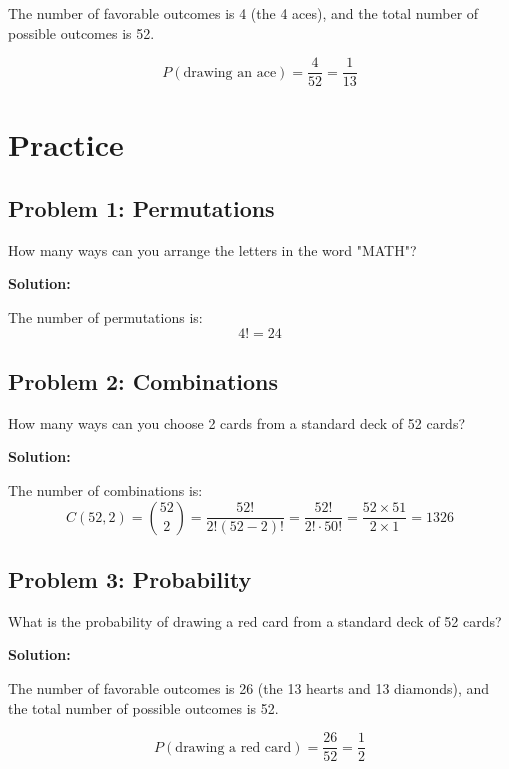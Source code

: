 \documentclass[12pt]{article}
\begin{document}
The number of favorable outcomes is 4 (the 4 aces), and the total number of possible outcomes is 52.

\[P(\text{drawing an ace}) = \frac{4}{52} = \frac{1}{13}\]

\newpage

\section*{Practice}

\subsection*{Problem 1: Permutations}

How many ways can you arrange the letters in the word "MATH"?

\textbf{Solution:}

The number of permutations is:
\[4! = 24\]

\subsection*{Problem 2: Combinations}

How many ways can you choose 2 cards from a standard deck of 52 cards?

\textbf{Solution:}

The number of combinations is:
\[C(52, 2) = \binom{52}{2} = \frac{52!}{2!(52-2)!} = \frac{52!}{2! \cdot 50!} = \frac{52 \times 51}{2 \times 1} = 1326\]

\subsection*{Problem 3: Probability}

What is the probability of drawing a red card from a standard deck of 52 cards?

\textbf{Solution:}

The number of favorable outcomes is 26 (the 13 hearts and 13 diamonds), and the total number of possible outcomes is 52.

\[P(\text{drawing a red card}) = \frac{26}{52} = \frac{1}{2}\]
\end{document}
